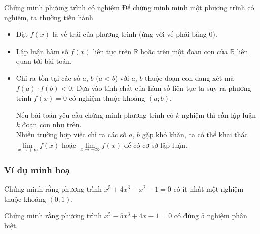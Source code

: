 \begin{dang}{Chứng minh phương trình có nghiệm}
	Để chứng minh minh một phương trình có nghiệm, ta thường tiến hành
	\begin{itemize}
		\item Đặt $f(x)$ là vế trái của phương trình (ứng với vế phải bằng $0$).
		\item Lập luận hàm số $f(x)$ liên tục trên $\mathbb{R}$ hoặc trên một đoạn con của $\mathbb{R}$ liên quan tới bài toán.
		\item Chỉ ra tồn tại các số $a$, $b$ ($a<b$) với $a$, $b$ thuộc đoạn con đang xét mà $f(a)\cdot f(b)<0$. Dựa vào tính chất của hàm số liên tục ta suy ra phương trình $f(x)=0$ có nghiệm thuộc khoảng $(a;b)$.		
		\begin{note}
			Nếu bài toán yêu cầu chứng minh phương trình có $k$ nghiệm thì cần lập luận $k$ đoạn con như trên.\\
			Nhiều trường hợp việc chỉ ra các số $a$, $b$ gặp khó khăn, ta có thể khai thác $\lim \limits _{x\to +\infty}f(x)$ hoặc $\lim \limits _{x\to -\infty}f(x)$ để có cơ sở lập luận. 
		\end{note}
	\end{itemize}
\end{dang}
\subsubsection{Ví dụ minh hoạ}
\begin{vd}%
	Chứng minh rằng phương trình $x^5+4x^3-x^2-1=0$ có ít nhất một nghiệm thuộc khoảng $(0;1)$.
\end{vd}
\begin{vd}%
	Chứng minh rằng phương trình $x^5-5x^3+4x-1=0$ có đúng $5$ nghiệm phân biệt.
\end{vd}


